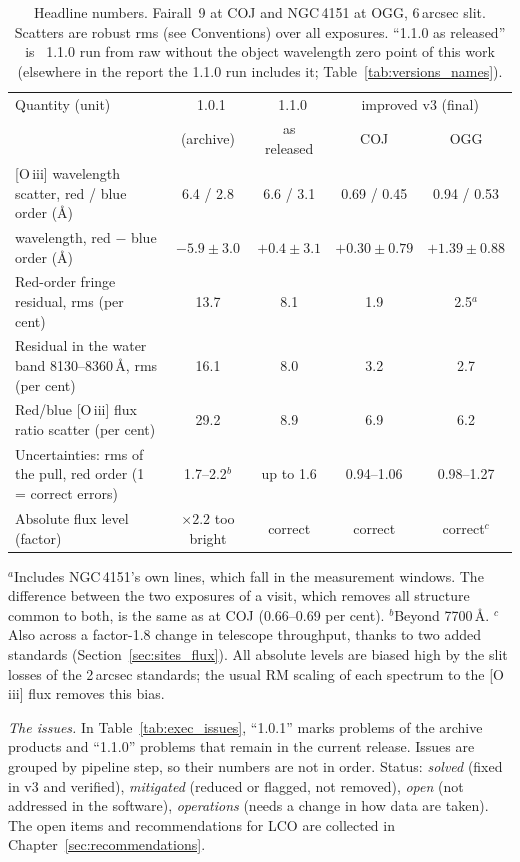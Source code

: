 \begin{table}[!htbp]
\centering
\caption{Headline numbers. Fairall~9 at COJ and NGC\,4151 at OGG, 6\,arcsec slit. Scatters are robust rms (see
Conventions) over all exposures. ``1.1.0 as released'' is \banzai{}~1.1.0 run from raw without the object wavelength
zero point of this work (elsewhere in the report the 1.1.0 run includes it; Table~\ref{tab:versions_names}).}
\label{tab:exec_numbers}
\small
\begin{tabular}{@{}>{\raggedright\arraybackslash}p{5.6cm}cccc@{}}
\toprule
Quantity (unit) & \banzai{}~1.0.1 & \banzai{}~1.1.0 & \multicolumn{2}{c}{improved v3 (final)} \\
 & (archive) & as released & COJ & OGG \\
\midrule
{[O\,{\sc iii}]} wavelength scatter, red / blue order (\AA) & 6.4 / 2.8 & 6.6 / 3.1 & 0.69 / 0.45 & 0.94 / 0.53 \\
{[O\,{\sc iii}]} wavelength, red $-$ blue order (\AA) & $-5.9\pm3.0$ & $+0.4\pm3.1$ & $+0.30\pm0.79$ & $+1.39\pm0.88$ \\
Red-order fringe residual, rms (per cent) & 13.7 & 8.1 & 1.9 & 2.5$^{a}$ \\
Residual in the water band 8130--8360\,\AA, rms (per cent) & 16.1 & 8.0 & 3.2 & 2.7 \\
Red/blue [O\,{\sc iii}] flux ratio scatter (per cent) & 29.2 & 8.9 & 6.9 & 6.2 \\
Uncertainties: rms of the pull, red order (1 = correct errors) & 1.7--2.2$^{b}$ & up to 1.6 & 0.94--1.06 & 0.98--1.27 \\
Absolute flux level (factor) & $\times2.2$ too bright & correct & correct & correct$^{c}$ \\
\bottomrule
\end{tabular}
\par\smallskip\raggedright\footnotesize
$^{a}$Includes NGC\,4151's own lines, which fall in the measurement windows. The difference between the two
exposures of a visit, which removes all structure common to both, is the same as at COJ (0.66--0.69 per cent).
$^{b}$Beyond 7700\,\AA. $^{c}$Also across a factor-1.8 change in telescope throughput, thanks to two added standards
(Section~\ref{sec:sites_flux}). All absolute levels are biased high by the slit losses of the 2\,arcsec standards; the
usual RM scaling of each spectrum to the [O\,{\sc iii}] flux removes this bias.
\end{table}

\textit{The issues.} In Table~\ref{tab:exec_issues}, ``1.0.1'' marks problems of the archive products and ``1.1.0''
problems that remain in the current release. Issues are grouped by pipeline step, so their numbers are not in order. Status: \textit{solved} (fixed in v3 and verified), \textit{mitigated}
(reduced or flagged, not removed), \textit{open} (not addressed in the software), \textit{operations} (needs a change in
how data are taken). The open items and recommendations for LCO are collected in Chapter~\ref{sec:recommendations}.

